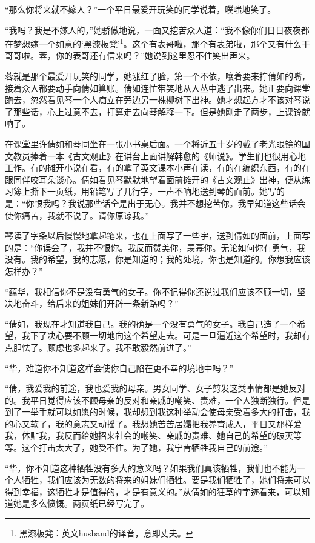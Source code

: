 \par “那么你将来就不嫁人？”一个平日最爱开玩笑的同学说着，噗嗤地笑了。
\par “我吗？我是不嫁人的，”她骄傲地说，一面又挖苦众人道：“我不像你们日日夜夜都在梦想嫁一个如意的‘黑漆板凳’\footnote{黑漆板凳：英文husband的译音，意即丈夫。}。这个有表哥啦，那个有表弟啦，那个又有什么干哥哥啦。蓉，你的表哥还有信来吗？”她说到这里忍不住笑出声来。
\par 蓉就是那个最爱开玩笑的同学，她涨红了脸，第一个不依，嚷着要来拧倩如的嘴，接着众人都要动手向倩如算账。倩如连忙带笑地从人丛中逃了出来。她正要向课堂跑去，忽然看见琴一个人痴立在旁边另一株柳树下出神。她才想起方才不该对琴说了那些话，心上过意不去，打算走去向琴解释一下。但是她刚走了两步，上课铃就响了。
\par 在课堂里许倩如和琴同坐在一张小书桌后面。一个将近五十岁的戴了老光眼镜的国文教员捧着一本《古文观止》在讲台上面讲解韩愈的《师说》。学生们也很用心地工作。有的摊开小说在看，有的拿了英文课本小声在读，有的在编织东西，有的在跟同伴咬耳朵谈心。倩如看见琴默默地望着面前摊开的《古文观止》出神，便从练习簿上撕下一页纸，用铅笔写了几行字，一声不响地送到琴的面前。她写的是：“你恨我吗？我说那些话全是出于无心。我并不想挖苦你。我早知道这些话会使你痛苦，我就不说了。请你原谅我。”
\par 琴读了字条以后慢慢地拿起笔来，也在上面写了一些字，送到倩如的面前，上面写的是：“你误会了，我并不恨你。我反而赞美你，羡慕你。无论如何你有勇气，我没有。我的希望，我的志愿，你是知道的；我的处境，你也是知道的。你想我应该怎样办？”
\par “蕴华，我相信你不是没有勇气的女子。你不记得你还说过我们应该不顾一切，坚决地奋斗，给后来的姐妹们开辟一条新路吗？”
\par “倩如，我现在才知道我自己。我的确是一个没有勇气的女子。我自己造了一个希望，我下了决心要不顾一切地向这个希望走去。可是一旦逼近这个希望时，我却有点胆怯了。顾虑也多起来了。我不敢毅然前进了。”
\par “华，难道你不知道这样会使你自己陷在更不幸的境地中吗？”
\par “倩，我爱我的前途，我也爱我的母亲。男女同学、女子剪发这类事情都是她反对的。我平日觉得应该不顾母亲的反对和亲戚的嘲笑、责难，一个人独断独行。但是到了一举手就可以如愿的时候，我却想到我这种举动会使母亲受着多大的打击，我的心又软了，我的意志又动摇了。我想她苦苦居孀把我养育成人，平日又那样爱我，体贴我，我反而给她招来社会的嘲笑、亲戚的责难、她自己的希望的破灭等等。这个打击太大了，她受不住。为了她，我宁肯牺牲我自己的前途。”
\par “华，你不知道这种牺牲没有多大的意义吗？如果我们真该牺牲，我们也不能为一个人牺牲，我们应该为无数的将来的姐妹们牺牲。要是我们牺牲了，她们将来可以得到幸福，这牺牲才是值得的，才是有意义的。”从倩如的狂草的字迹看来，可以知道她是多么愤慨。两页纸已经写完了。
